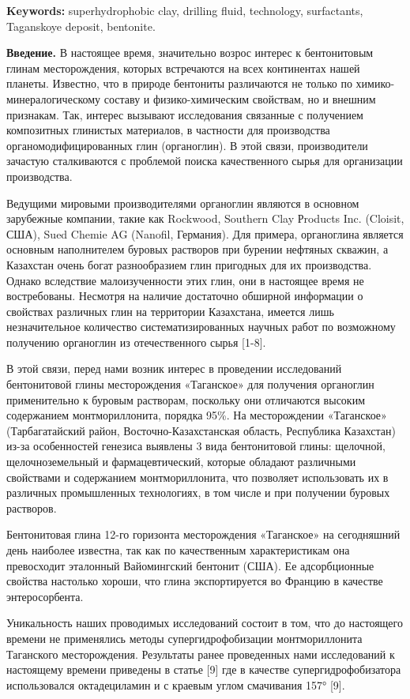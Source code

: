 \textbf{Keywords:} superhydrophobic clay, drilling fluid, technology,
surfactants, Taganskoye deposit, bentonite.

\textbf{Введение.} В настоящее время, значительно возрос интерес к
бентонитовым глинам месторождения, которых встречаются на всех
континентах нашей планеты. Известно, что в природе бентониты различаются
не только по химико-минералогическому составу и физико-химическим
свойствам, но и внешним признакам. Так, интерес вызывают исследования
связанные с получением композитных глинистых материалов, в частности для
производства органомодифицированных глин (органоглин). В этой связи,
производители зачастую сталкиваются с проблемой поиска качественного
сырья для организации производства.

Ведущими мировыми производителями органоглин являются в основном
зарубежные компании, такие как Rockwood, Southern Clay Рroducts Inc.
(Cloisit, США), Sued Chemie AG (Nanofil, Германия). Для примера,
органоглина является основным наполнителем буровых растворов при бурении
нефтяных скважин, а Казахстан очень богат разнообразием глин пригодных
для их производства. Однако вследствие малоизученности этих глин, они в
настоящее время не востребованы. Несмотря на наличие достаточно обширной
информации о свойствах различных глин на территории Казахстана, имеется
лишь незначительное количество систематизированных научных работ по
возможному получению органоглин из отечественного сырья {[}1-8{]}.

В этой связи, перед нами возник интерес в проведении исследований
бентонитовой глины месторождения «Таганское» для получения органоглин
применительно к буровым растворам, поскольку они отличаются высоким
содержанием монтмориллонита, порядка 95\%. На месторождении «Таганское»
(Тарбагатайский район, Восточно-Казахстанская область, Республика
Казахстан) из-за особенностей генезиса выявлены 3 вида бентонитовой
глины: щелочной, щелочноземельный и фармацевтический, которые обладают
различными свойствами и содержанием монтмориллонита, что позволяет
использовать их в различных промышленных технологиях, в том числе и при
получении буровых растворов.

Бентонитовая глина 12-го горизонта месторождения «Таганское» на
сегодняшний день наиболее известна, так как по качественным
характеристикам она превосходит эталонный Вайомингский бентонит (США).
Ее адсорбционные свойства настолько хороши, что глина экспортируется во
Францию в качестве энтеросорбента.

Уникальность наших проводимых исследований состоит в том, что до
настоящего времени не применялись методы супергидрофобизации
монтмориллонита Таганского месторождения. Результаты ранее проведенных
нами исследований к настоящему времени приведены в статье {[}9{]} где в
качестве супергидрофобизатора использовался октадециламин и с краевым
углом смачивания 157° {[}9{]}.

